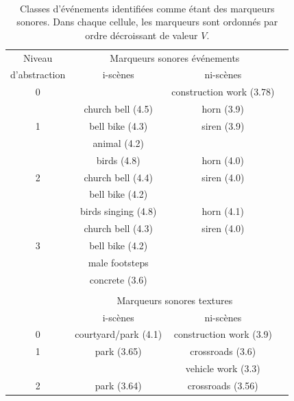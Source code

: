  \\

\begin{table}[t]
 \setlength{\tabcolsep}{0.2pt}
 \centering
  {\renewcommand{\arraystretch}{0.9}
\begin{tabular}{c c c c} 
Niveau        & \multicolumn{2}{c}{Marqueurs sonores événements} \\
d'abstraction & i-scènes & ni-scènes \\
\hline
0  &                               &  construction work (3.78)  \\
\hline
  & church bell  (4.5)             & horn  (3.9) \\
1 & bell bike    (4.3)             & siren (3.9)\\
  & animal       (4.2)             &       \\
   \hline
  & birds        (4.8)             & horn  (4.0)\\
2 & church bell  (4.4)             & siren (4.0)\\
  & bell bike    (4.2)             &       \\
   \hline
  & birds singing (4.8)            & horn  (4.1)\\
  & church bell   (4.3)            & siren (4.0)\\
3 & bell bike     (4.2)            &       \\
  & male footsteps                 &  \\
  &   concrete (3.6)               &  \\
  &                                & \\ 
  & \multicolumn{2}{c}{Marqueurs sonores textures}      \\
  & i-scènes & ni-scènes \\
\hline
0 &     courtyard/park (4.1)       &  construction work (3.9)  \\
\hline
1 &     park (3.65)                &  crossroads (3.6)  \\
  &                                &  vehicle work (3.3)  \\
\hline
2 &     park (3.64)                &  crossroads (3.56)  \\
\hline
\end{tabular}
}
\vspace{0.5mm}
\caption[Classes d'événements identifiées comme étant des marqueurs sonores]{Classes d'événements identifiées comme étant des marqueurs sonores. Dans chaque cellule, les marqueurs sont ordonnés par ordre décroissant de valeur $V$.}
\label{tab:markers}
\end{table}

